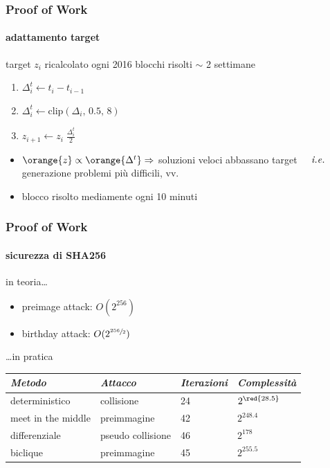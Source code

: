\begin{frame}
	\frametitle{Proof of Work}
	\framesubtitle{adattamento target}
	
	target $z_i$ ricalcolato ogni 2016 blocchi risolti $\sim$ 2 settimane
	\begin{enumerate}
		\item $\Delta_i^t \leftarrow t_{i} - t_{i-1}$
		\item $\Delta_i^t \leftarrow \mathrm{clip}(\Delta_i,\,0.5,\,8)$
		\item $z_{i+1} \leftarrow z_i\;\frac{\Delta_i^t}{2}$
	\end{enumerate}
	\begin{itemize}
		\item $\orange{z} \propto \orange{\Delta^t} \Rightarrow$ {\color{blue}soluzioni veloci} abbassano target 
			\newline $\;\;\;\;\text{\textit{i.e.}}$ generazione {\color{blue}problemi più difficili}, vv.
		\item blocco risolto mediamente ogni 10 minuti
	\end{itemize}
\end{frame}
\begin{frame}
	\frametitle{Proof of Work}
	\framesubtitle{sicurezza di SHA256}
	
	in teoria\ldots
	\begin{itemize}
		\item {\color{blue}preimage} attack: $O(2^{256})$
		\item {\color{blue}birthday} attack: $O(2^{\sfrac{256}{2}})$
	\end{itemize}
	
	\ldots in pratica
	
	\begin{table}
	    \begin{tabular}{l|l|l|l}
		    \textit{Metodo}             & \textit{Attacco}           & \textit{Iterazioni} & \textit{Complessità} \\ \hline
		    deterministico     & collisione        & 24         & $2^{\red{28.5}}$ \\
		    meet in the middle & preimmagine       & 42         & $2^{248.4}$ \\
		    differenziale      & pseudo collisione & 46         & $2^{178}$ \\
		    biclique           & preimmagine       & 45         & $2^{255.5}$ \\
	    \end{tabular}
	\end{table}
\end{frame}
